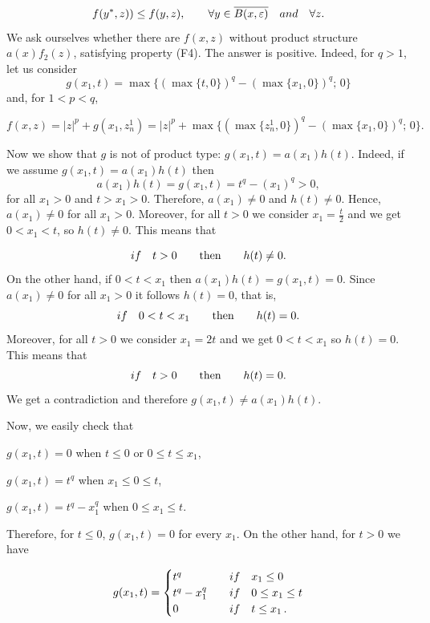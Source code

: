 \documentclass[a4paper,10pt]{article}
\theoremstyle{plain}
\theoremstyle{definition}
\numberwithin{equation}{section} \makeatletter
\begin{document}
$$f(y^*,z))\le f(y,z), \qquad \forall y \in  \overline{B(x,\varepsilon)}\quad {\rm and} \quad \forall z .$$ 
We ask ourselves whether there are $f(x,z)$ without product structure $ a(x)f_2(z)$,  satisfying property {(F4)}. The answer is positive. Indeed, for $q>1$, let us consider
$$g(x_1,t)=\max\{(\max \{t,0\})^q - (\max \{x_1,0\})^q;\, 0\}$$
and, for $1<p<q$, 

$$f(x,z)=|z|^p+ g(x_1,z_n^1)=|z|^p+\max\{(\max \{z_n^1,0\})^q - (\max \{x_1,0\})^q;\, 0\}.$$

\noindent Now we show that $g$ is not of product type: $g(x_1,t)=a(x_1)h(t)$. Indeed, if we assume $g(x_1,t)=a(x_1)h(t)$ then
$$a(x_1)h(t)=g(x_1,t)=t^q-(x_1)^q>0,$$
for all $x_1>0$ and $t>x_1>0$. Therefore,  $a(x_1)\ne 0$ and $ h(t)\ne 0$. Hence,  $a(x_1)\ne 0$
for all $x_1>0$. Moreover, for all $t>0$ we consider $x_1=\frac{t}{2}$ and we get $0<x_1<t$, so  $h(t)\ne 0$. This means that 

$$ {\rm if} \quad t>0 \qquad \text{then} \qquad h(t) \ne 0. $$
\noindent
On the other hand, if $0<t<x_1$ then $a(x_1)h(t)=g(x_1,t)=0$. Since $a(x_1)\ne 0$  for all $x_1>0$ it follows $h(t)=0$, that is,
$$ {\rm if} \quad 0<t<x_1 \qquad \text{then}\qquad h(t)= 0.$$
Moreover, for all $t>0$ we consider $x_1=2t$ and we get $0<t<x_1$ so $h(t)=0$. This means that
$${\rm if} \quad t>0 \qquad \text{then} \qquad h(t) = 0. $$ 
We get a contradiction and therefore $g(x_1,t) \ne a(x_1)h(t)$.


















\noindent
Now, we easily check that
 
$g(x_1,t)=0$  when $t \leq 0$ or $0 \leq t \leq x_1$,

$g(x_1,t)=t^q$ when  $x_1 \leq 0 \leq t$,  

$g(x_1,t)=t^q-x_1^q$  when $0 \leq x_1 \leq t$. 

\vskip0.3cm

\noindent 
 Therefore, for $t\le 0 $, $g(x_1,t)=0$ for every $x_1$. On the other hand, for $t>0$ we have 

\begin{equation*}
g(x_1,t)=\begin{cases}
t^q &\quad {\rm if}\quad x_1\le 0\\
t^q-x_1^q &\quad {\rm if}\quad 0\le x_1\le t \\
0 &\quad {\rm if}\quad t\le x_1\,.
\end{cases}
\end{equation*}
\end{document}
